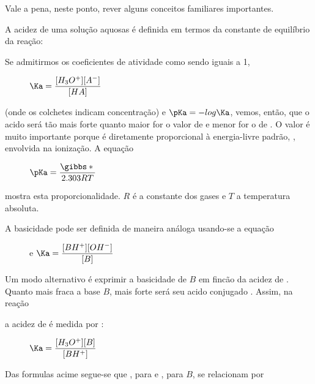 Vale a pena, neste ponto, rever alguns conceitos familiares importantes.

A acidez de uma solução aquosas é definida em termos da constante de equilíbrio \Ka da reação:

\begin{figure}[H]
    \centering
\end{figure}

\noindent Se admitirmos os coeficientes de atividade como sendo iguais a 1,

\begin{figure}[H]
    \centering
    $\Ka = \dfrac{[H_{3}O^{+}][A^{-}]}{[HA]}$
\end{figure}

\noindent (onde os colchetes indicam concentração) e $\pKa = -log \Ka$, vemos, então, que o acido será tão mais forte quanto maior for o valor de \Ka \enspace e menor for o de \pKa. O valor \pKa\enspace é muito importante porque é diretamente proporcional à energia-livre padrão, \gibbs*{}, envolvida na ionização. A equação

\begin{figure}[H]
    \centering
    $\pKa = \dfrac{\gibbs*{}}{2.303RT}$
\end{figure}

\noindent mostra esta proporcionalidade. $R$ é a constante dos gases e $T$ a temperatura absoluta.

A basicidade pode ser definida de maneira análoga usando-se a equação

\begin{figure}[H]
    \centering
     e $\Ka = \dfrac{[BH^{+}][OH^{-}]}{[B]}$
\end{figure}

\noindent Um modo alternativo é exprimir a basicidade de $B$ em fincão da acidez de . Quanto mais fraca a base $B$, mais forte será seu acido conjugado . Assim, na reação 

\begin{figure}[H]
    \centering
\end{figure}

\noindent a acidez de  é medida por \Ka:

\begin{figure}[H]
    \centering
    $\Ka = \dfrac{[H_{3}O^{+}][B]}{[BH^{+}]}$
\end{figure}

\noindent Das formulas acime segue-se que \Ka, para  e \Kb, para $B$, se relacionam por

